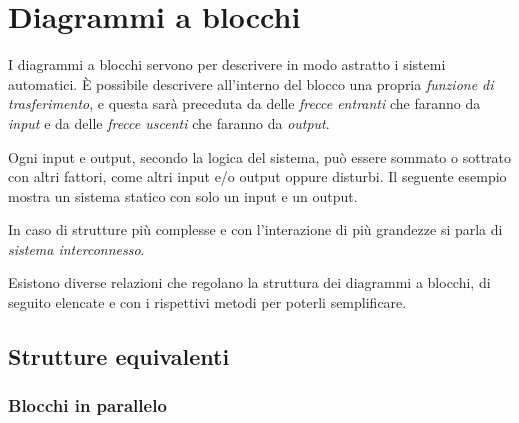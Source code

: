 \chapter{Diagrammi a blocchi}

I diagrammi a blocchi servono per descrivere in modo astratto i sistemi automatici.
È possibile descrivere all'interno del blocco una propria \emph{funzione di trasferimento},
e questa sarà preceduta da delle \emph{frecce entranti} che faranno da \emph{input} e
da delle \emph{frecce uscenti} che faranno da \emph{output}.

Ogni input e output, secondo la logica del sistema, può essere sommato o sottrato con
altri fattori, come altri input e/o output oppure disturbi.
Il seguente esempio mostra un sistema statico con solo un input e un output.
\begin{center}\end{center}

In caso di strutture più complesse e con l'interazione di più grandezze si parla
di \emph{sistema interconnesso}.

Esistono diverse relazioni che regolano la struttura dei diagrammi a blocchi,
di seguito elencate e con i rispettivi metodi per poterli semplificare.

\section{Strutture equivalenti}
\subsection{Blocchi in parallelo}
\begin{center}\end{center}

